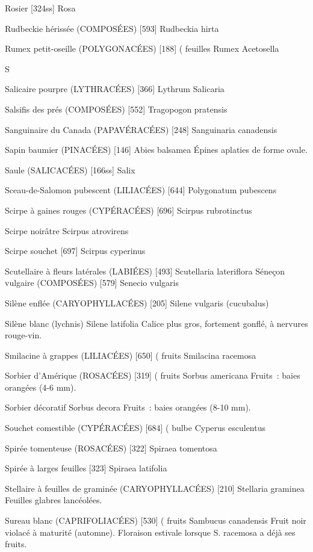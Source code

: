 \documentclass[book,12pt,a4paper,onecolumn,openany]{memoir}
\begin{document}
Rosier  [324ss]
				Rosa

Rudbeckie hérissée (COMPOSÉES)  [593]
				Rudbeckia hirta

Rumex petit-oseille (POLYGONACÉES)  [188]		( feuilles
				Rumex Acetosella

S

Salicaire pourpre (LYTHRACÉES)  [366]
				Lythrum Salicaria

Salsifis des prés (COMPOSÉES)  [552]
				Tragopogon pratensis


Sanguinaire du Canada (PAPAVÉRACÉES)  [248]
				Sanguinaria canadensis

Sapin baumier (PINACÉES) [146]
				Abies balsamea
Épines aplaties de forme ovale.

Saule (SALICACÉES)  [166ss]
				Salix

Sceau-de-Salomon pubescent (LILIACÉES)  [644]
				Polygonatum pubescens

Scirpe à gaines rouges (CYPÉRACÉES)  [696]
				Scirpus rubrotinctus

Scirpe noirâtre
				Scirpus atrovirens

Scirpe souchet  [697]
				Scirpus cyperinus

Scutellaire à fleurs latérales (LABIÉES)  [493]
				Scutellaria lateriflora
Séneçon vulgaire (COMPOSÉES)  [579]
				Senecio vulgaris

Silène enflée (CARYOPHYLLACÉES)  [205]
				Silene vulgaris (cucubalus)

Silène blanc (lychnis)
				Silene latifolia
Calice plus gros, fortement gonflé, à nervures rouge-vin.

Smilacine à grappes (LILIACÉES)  [650]			( fruits
				Smilacina racemosa

Sorbier d’Amérique (ROSACÉES)  [319]			( fruits
				Sorbus americana
Fruits : baies orangées (4-6 mm).

Sorbier décoratif
				Sorbus decora
Fruits : baies orangées (8-10 mm).

Souchet comestible (CYPÉRACÉES)  [684]			( bulbe
				Cyperus esculentus

Spirée tomenteuse (ROSACÉES)  [322]
				Spiraea tomentosa

Spirée à larges feuilles  [323]
				Spiraea latifolia

Stellaire à feuilles de graminée (CARYOPHYLLACÉES)  [210]
				Stellaria graminea
Feuilles glabres lancéolées.

Sureau blanc (CAPRIFOLIACÉES)  [530]			( fruits
				Sambucus canadensis
Fruit noir violacé à maturité (automne). Floraison estivale lorsque S. racemosa a déjà ses fruits.
\end{document}
